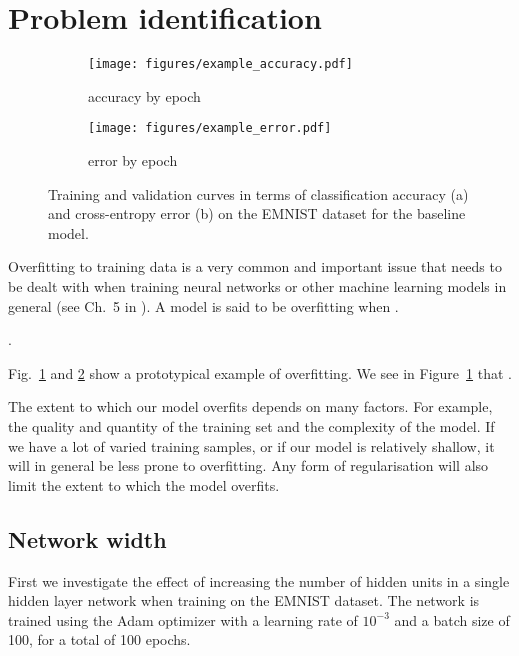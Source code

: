 \documentclass{article}
\begin{document}
\section{Problem identification}
\label{sec:task1}

\begin{figure}[t]
    \centering
    \begin{subfigure}{\linewidth}
        \texttt{[image: figures/example\_accuracy.pdf]}
        \caption{accuracy by epoch}
        \label{fig:example_acccurves}
    \end{subfigure} 
    \begin{subfigure}{\linewidth}
        \centering
        \texttt{[image: figures/example\_error.pdf]}
        \caption{error by epoch}
        \label{fig:example_errorcurves}
    \end{subfigure} 
    \caption{Training and validation curves in terms of classification accuracy (a) and cross-entropy error (b) on the EMNIST dataset for the baseline model.}
    \label{fig:example}
\end{figure} 

Overfitting to training data is a very common and important issue that needs to be dealt with when training neural networks or other machine learning models in general (see Ch.~5 in \citealt{Goodfellow-et-al-2016}).
A model is said to be overfitting when \questionFive.

\questionSix.

Fig.~\ref{fig:example_acccurves} and \ref{fig:example_errorcurves} show a prototypical example of overfitting.
We see in Figure~\ref{fig:example_acccurves} that \questionSeven.

The extent to which our model overfits depends on many factors.
For example, the quality and quantity of the training set and
the complexity of the model. If we have a lot of varied training samples,
or if our model is relatively shallow, it will in general
be less prone to overfitting. Any form of regularisation
will also limit the extent to which the model overfits.


\subsection{Network width}

\questionTableOne
\questionFigureTwo


First we investigate the effect of increasing the number of
hidden units in a single hidden layer network when training
on the EMNIST dataset.
The network is trained using the Adam optimizer
with a learning rate of $10^{-3}$ and a batch size of 100, for a total of 100 epochs.
\end{document}
